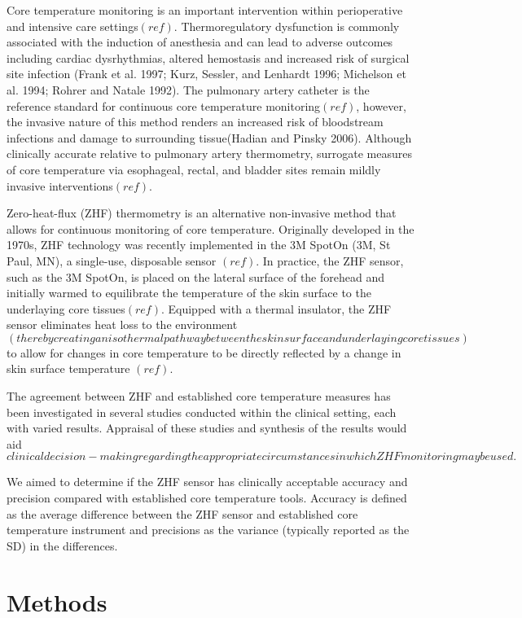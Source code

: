 \documentclass[smallextended]{svjour3}       %
\begin{document}
Core temperature monitoring is an important intervention within
perioperative and intensive care settings\((ref)\). Thermoregulatory
dysfunction is commonly associated with the induction of anesthesia and
can lead to adverse outcomes including cardiac dysrhythmias, altered
hemostasis and increased risk of surgical site infection (Frank et al.
1997; Kurz, Sessler, and Lenhardt 1996; Michelson et al. 1994; Rohrer
and Natale 1992). The pulmonary artery catheter is the reference
standard for continuous core temperature monitoring\((ref)\), however,
the invasive nature of this method renders an increased risk of
bloodstream infections and damage to surrounding tissue(Hadian and
Pinsky 2006). Although clinically accurate relative to pulmonary artery
thermometry, surrogate measures of core temperature via esophageal,
rectal, and bladder sites remain mildly invasive interventions\((ref)\).

Zero-heat-flux (ZHF) thermometry is an alternative non-invasive method
that allows for continuous monitoring of core temperature. Originally
developed in the 1970s, ZHF technology was recently implemented in the
3M SpotOn (3M, St Paul, MN), a single-use, disposable sensor \((ref)\).
In practice, the ZHF sensor, such as the 3M SpotOn, is placed on the
lateral surface of the forehead and initially warmed to equilibrate the
temperature of the skin surface to the underlaying core
tissues\((ref)\). Equipped with a thermal insulator, the ZHF sensor
eliminates heat loss to the environment
\((thereby creating an isothermal pathway between the skin surface and underlaying core tissues)\)
to allow for changes in core temperature to be directly reflected by a
change in skin surface temperature \((ref)\).

The agreement between ZHF and established core temperature measures has
been investigated in several studies conducted within the clinical
setting, each with varied results. Appraisal of these studies and
synthesis of the results would aid
\(clinical decision-making regarding the appropriate circumstances in which ZHF monitoring may be used.\)

We aimed to determine if the ZHF sensor has clinically acceptable
accuracy and precision compared with established core temperature tools.
Accuracy is defined as the average difference between the ZHF sensor and
established core temperature instrument and precisions as the variance
(typically reported as the SD) in the differences.

\hypertarget{methods}{%
\section{Methods}\label{methods}}
\end{document}
